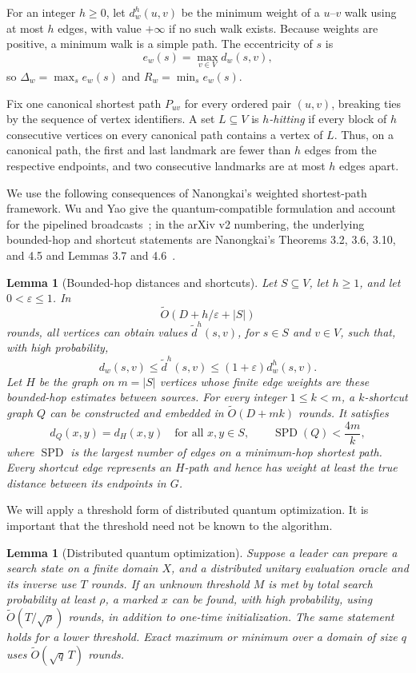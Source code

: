 \documentclass[11pt]{article}
\newtheorem{lemma}[theorem]{Lemma}
\theoremstyle{definition}
\newcommand{\eps}{\varepsilon}
\newcommand{\dist}{d_w}
\newcommand{\diamw}{\Delta_w}
\newcommand{\radw}{R_w}
\newcommand{\ecc}{e_w}
\newcommand{\wtO}{\widetilde O}
\begin{document}
For an integer $h\geq 0$, let $\dist^h(u,v)$ be the minimum weight of a
$u$--$v$ walk using at most $h$ edges, with value $+\infty$ if no such walk
exists.  Because weights are positive, a minimum walk is a simple path.  The
eccentricity of $s$ is
\[
  \ecc(s)=\max_{v\in V}\dist(s,v),
\]
so $\diamw=\max_s\ecc(s)$ and $\radw=\min_s\ecc(s)$.

Fix one canonical shortest path $P_{uv}$ for every ordered pair $(u,v)$,
breaking ties by the sequence of vertex identifiers.  A set $L\subseteq V$ is
\emph{$h$-hitting} if every block of $h$ consecutive vertices on every
canonical path contains a vertex of $L$.  Thus, on a canonical path, the first
and last landmark are fewer than $h$ edges from the respective endpoints, and
two consecutive landmarks are at most $h$ edges apart.

We use the following consequences of Nanongkai's weighted shortest-path
framework.  Wu and Yao give the quantum-compatible formulation and account
for the pipelined broadcasts~\cite[Sec.~3 and App.~A]{WuYao2022}; in the
arXiv v2 numbering, the underlying bounded-hop and shortcut statements are
Nanongkai's Theorems 3.2, 3.6, 3.10, and 4.5 and
Lemmas 3.7 and 4.6~\cite{Nanongkai2014}.

\begin{lemma}[Bounded-hop distances and shortcuts]
\label{lem:source-shortcuts}
Let $S\subseteq V$, let $h\geq1$, and let $0<\eps\leq1$.  In
\[
  \wtO(D+h/\eps+|S|)
\]
rounds, all vertices can obtain values $\widetilde d^h(s,v)$, for
$s\in S$ and $v\in V$, such that, with high probability,
\[
  \dist(s,v)\leq \widetilde d^h(s,v)
  \leq(1+\eps)\dist^h(s,v).
  \tag{2}\label{eq:hop-estimate}
\]
Let $H$ be the graph on $m=|S|$ vertices whose finite edge weights are these
bounded-hop estimates between sources.  For every integer $1\leq k<m$, a
$k$-shortcut graph $Q$ can be constructed and embedded in
$\wtO(D+mk)$ rounds.  It satisfies
\[
  d_Q(x,y)=d_H(x,y)\quad\text{for all }x,y\in S,
  \qquad
  \operatorname{SPD}(Q)<\frac{4m}{k},
  \tag{3}\label{eq:shortcut-properties}
\]
where $\operatorname{SPD}$ is the largest number of edges on a
minimum-hop shortest path.  Every shortcut edge represents an $H$-path and
hence has weight at least the true distance between its endpoints in $G$.
\end{lemma}

We will apply a threshold form of distributed quantum optimization.  It is
important that the threshold need not be known to the algorithm.

\begin{lemma}[Distributed quantum optimization]
\label{lem:quantum-optimization}
Suppose a leader can prepare a search state on a finite domain $X$, and a
distributed unitary evaluation oracle and its inverse use $T$ rounds.  If an
unknown threshold $M$ is met by total search probability at least $\rho$, a
marked $x$ can be found, with high probability, using
$\wtO(T/\sqrt\rho)$ rounds, in addition to one-time initialization.  The same
statement holds for a lower threshold.  Exact maximum or minimum over a domain
of size $q$ uses $\wtO(\sqrt q\,T)$ rounds.
\end{lemma}
\end{document}
